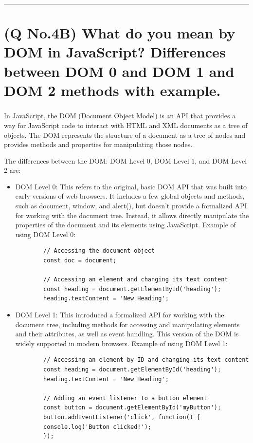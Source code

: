 \documentclass[11pt]{article}
\begin{document}
\noindent\rule{\linewidth}{0.4pt}
\section{(Q No.4B) What do you  mean by DOM in JavaScript? Differences between DOM 0 and DOM 1 and DOM 2 methods with example.}
\subparagraph{}
In JavaScript, the DOM (Document Object Model) is an API that provides a way for JavaScript code to interact with HTML and XML documents as a tree of objects. The DOM represents the structure of a document as a tree of nodes and provides methods and properties for manipulating those nodes.

The differences between the DOM: DOM Level 0, DOM Level 1, and DOM Level 2 are:

\begin{itemize}
    \item DOM Level 0: This refers to the original, basic DOM API that was built into early versions of web browsers. It includes a few global objects and methods, such as document, window, and alert(), but doesn't provide a formalized API for working with the document tree. Instead, it allows directly manipulate the properties of the document and its elements using JavaScript.
    Example of using DOM Level 0:
    \begin{lstlisting}
        // Accessing the document object
        const doc = document;
    
        // Accessing an element and changing its text content
        const heading = document.getElementById('heading');
        heading.textContent = 'New Heading';
    \end{lstlisting}
    
    \item DOM Level 1: This introduced a formalized API for working with the document tree, including methods for accessing and manipulating elements and their attributes, as well as event handling. This version of the DOM is widely supported in modern browsers.
    Example of using DOM Level 1:
    \begin{lstlisting}
        // Accessing an element by ID and changing its text content
        const heading = document.getElementById('heading');
        heading.textContent = 'New Heading';
    
        // Adding an event listener to a button element
        const button = document.getElementById('myButton');
        button.addEventListener('click', function() {
        console.log('Button clicked!');
        });
    

\end{lstlisting}
\end{itemize}
\end{document}
